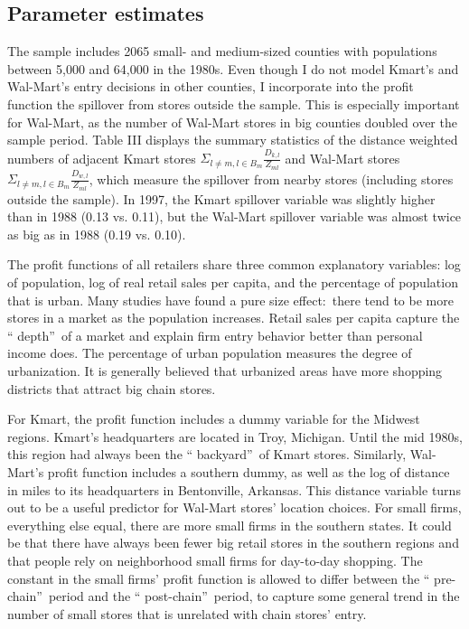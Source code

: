 \documentclass[notitlepage,onecolumn,11pt]{article}
\begin{document}
\subsection{Parameter estimates\label{Parameter}}

The sample includes 2065 small- and medium-sized counties with populations
between 5,000 and 64,000 in the 1980s. Even though I do not model Kmart's
and Wal-Mart's entry decisions in other counties, I incorporate into the
profit function the spillover from stores outside the sample. This is
especially important for Wal-Mart, as the number of Wal-Mart stores in big
counties doubled over the sample period. Table III displays the summary
statistics of the distance weighted numbers of adjacent Kmart stores $\Sigma
_{l\neq m,l\in B_{m}}\frac{D_{k,l}}{Z_{ml}}$ and Wal-Mart stores $\Sigma
_{l\neq m,l\in B_{m}}\frac{D_{w,l}}{Z_{ml}}$, which measure the spillover
from nearby stores (including stores outside the sample). In 1997, the Kmart
spillover variable was slightly higher than in 1988 (0.13 vs. 0.11), but the
Wal-Mart spillover variable was almost twice as big as in 1988 (0.19 vs.
0.10).

The profit functions of all retailers share three common explanatory
variables: log of population, log of real retail sales per capita, and the
percentage of population that is urban. Many studies have found a pure size
effect:\ there tend to be more stores in a market as the population
increases. Retail sales per capita capture the \textquotedblleft
depth\textquotedblright\ of a market and explain firm entry behavior better
than personal income does. The percentage of urban population measures the
degree of urbanization. It is generally believed that urbanized areas have
more shopping districts that attract big chain stores.

For Kmart, the profit function includes a dummy variable for the Midwest
regions. Kmart's headquarters are located in Troy, Michigan. Until the mid
1980s, this region had always been the \textquotedblleft
backyard\textquotedblright\ of Kmart stores. Similarly, Wal-Mart's profit
function includes a southern dummy, as well as the log of distance in miles
to its headquarters in Bentonville, Arkansas. This distance variable turns
out to be a useful predictor for Wal-Mart stores' location choices. For
small firms, everything else equal, there are more small firms in the
southern states. It could be that there have always been fewer big retail
stores in the southern regions and that people rely on neighborhood small
firms for day-to-day shopping. The constant in the small firms' profit
function is allowed to differ between the \textquotedblleft
pre-chain\textquotedblright\ period and the \textquotedblleft
post-chain\textquotedblright\ period, to capture some general trend in the
number of small stores that is unrelated with chain stores' entry.
\end{document}
